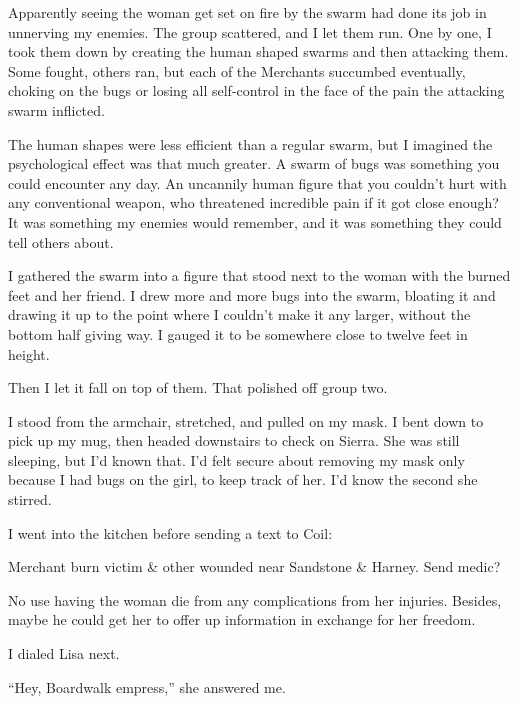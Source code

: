 Apparently seeing the woman get set on fire by the swarm had done its job in unnerving my enemies.  The group scattered, and I let them run.  One by one, I took them down by creating the human shaped swarms and then attacking them.  Some fought, others ran, but each of the Merchants succumbed eventually, choking on the bugs or losing all self-control in the face of the pain the attacking swarm inflicted.



The human shapes were less efficient than a regular swarm, but I imagined the psychological effect was that much greater.  A swarm of bugs was something you could encounter any day.  An uncannily human figure that you couldn't hurt with any conventional weapon, who threatened incredible pain if it got close enough?  It was something my enemies would remember, and it was something they could tell others about.



I gathered the swarm into a figure that stood next to the woman with the burned feet and her friend.  I drew more and more bugs into the swarm, bloating it and drawing it up to the point where I couldn't make it any larger, without the bottom half giving way.  I gauged it to be somewhere close to twelve feet in height.



Then I let it fall on top of them.  That polished off group two.



I stood from the armchair, stretched, and pulled on my mask.  I bent down to pick up my mug, then headed downstairs to check on Sierra.  She was still sleeping, but I'd known that.  I'd felt secure about removing my mask only because I had bugs on the girl, to keep track of her.  I'd know the second she stirred.



I went into the kitchen before sending a text to Coil:



Merchant burn victim & other wounded near Sandstone & Harney.  Send medic?



No use having the woman die from any complications from her injuries.  Besides, maybe he could get her to offer up information in exchange for her freedom.



I dialed Lisa next.



``Hey, Boardwalk empress,'' she answered me.



